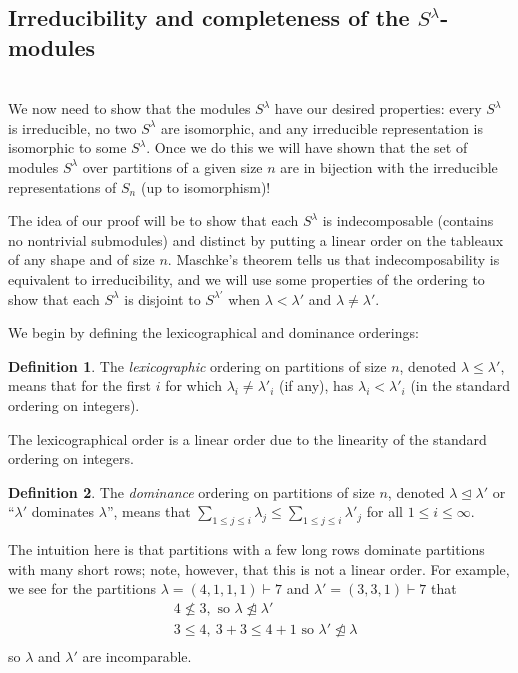 \documentclass[12pt,twoside]{reedthesis}
\theoremstyle{plain}   %
\theoremstyle{definition}
\newtheorem{defn}{Definition}[section]
\theoremstyle{remark}
\numberwithin{equation}{section}
\def\normeq{\trianglelefteq}
\begin{document}
  \subsection{Irreducibility and completeness of the $S^\lambda$-modules} \hfill\\
  We now need to show that the modules $S^\lambda$ have our desired properties: every $S^\lambda$ is irreducible, no two $S^\lambda$ are isomorphic,
  and any irreducible representation is isomorphic to some $S^\lambda$. Once we do this we will have shown that the set of modules $S^\lambda$
  over partitions of a given size $n$
  are in bijection with the irreducible representations of $S_n$ (up to isomorphism)! \par
  The idea of our proof will be to show that each $S^\lambda$ is indecomposable (contains no nontrivial submodules)
  and distinct by putting a linear order on the tableaux of any shape
  and of size $n$. Maschke's theorem tells us that indecomposability is equivalent to irreducibility, and we will use some properties of the ordering
  to show that each $S^\lambda$ is disjoint to $S^{\lambda'}$ when $\lambda < \lambda'$ and $\lambda \neq \lambda'$.
  \par
  We begin by defining the lexicographical and dominance orderings:
  \begin{defn}
    The \emph{lexicographic} ordering on partitions of size $n$, denoted $ \lambda \leq \lambda'$, means that
    for the first $i$ for which $\lambda_i \neq \lambda'_i$ (if any), has $\lambda_i < \lambda'_i$ (in the standard ordering on integers).
  \end{defn}
  The lexicographical order is a linear order due to the linearity of the standard ordering on integers.
  \begin{defn}
    The \emph{dominance} ordering on partitions of size $n$, denoted $ \lambda \normeq \lambda'$ or ``$\lambda'$ dominates $\lambda$'',
    means that $\sum_{1 \leq j \leq i} \lambda_j \leq \sum_{1 \leq j \leq i} \lambda'_j$ for all $ 1 \leq i \leq \infty$. \par
    The intuition here is that partitions with a few long rows dominate partitions with many short rows; note, however, that this is
    not a linear order. For example, we see for the partitions $\lambda = (4,1,1,1) \vdash 7$ and $\lambda' = (3,3,1) \vdash 7$ that
    \begin{align*}
      &4 \not \leq 3, \text{ so $\lambda \not \normeq \lambda'$}\\
      &3 \leq  4, \ 3 + 3 \leq 4 + 1  \text{ so $\lambda' \not \normeq \lambda$}\\
    \end{align*}
    so $\lambda$ and $\lambda'$ are incomparable.
  \end{defn}
\end{document}
